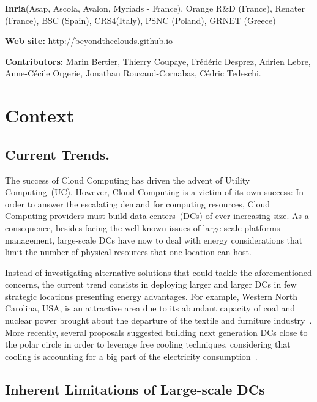 \documentclass[11pt,a4paper,twoside]{article}
\begin{document}
\textbf{Inria}(Asap, Ascola, Avalon, Myriads - France),  Orange R\&D (France), Renater (France), BSC (Spain), CRS4(Italy), PSNC (Poland), GRNET (Greece)



\smallskip
\noindent \textbf{Web site:} \url{http://beyondtheclouds.github.io}

\smallskip
\noindent\textbf{Contributors:} Marin Bertier, Thierry Coupaye, Fr{\'e}d{\'e}ric Desprez, Adrien Lebre, Anne-Cécile Orgerie, Jonathan Rouzaud-Cornabas, Cédric Tedeschi.
\pagebreak

\thispagestyle{fancy} 
\setcounter{page}{1}

\section{Context\label{sec:intro}}

\subsection{Current Trends.}

The success of Cloud Computing has driven the advent of Utility Computing~(UC). However, Cloud
Computing is a victim of its own success: In order to answer the escalating demand for
computing resources, Cloud Computing providers must build data centers~(DCs) of
ever-increasing size. As a consequence, besides facing the well-known issues of large-scale platforms
management, large-scale DCs have now to deal with energy considerations that limit the number
of physical resources that one location can host.

Instead of investigating alternative solutions that could tackle the aforementioned
concerns, the current trend consists in deploying larger and larger DCs in few strategic
locations presenting energy advantages. For example, Western North Carolina, USA, is an
attractive area due to its abundant capacity of coal and nuclear power brought about the
departure of the textile and furniture industry~\cite{greenpeace:2013}. More recently,
several proposals suggested building next generation DCs close to the polar circle in
order to leverage free cooling techniques, considering that cooling is accounting for a
big part of the electricity consumption~\cite{greenberg:sigcomm09}.

\subsection{Inherent Limitations of Large-scale DCs}
\end{document}
